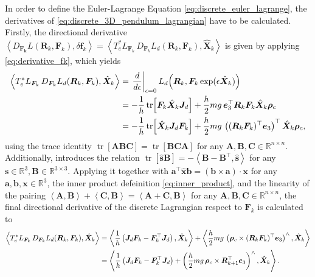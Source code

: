 In order to define the Euler-Lagrange Equation \eqref{eq:discrete_euler_lagrange}, the derivatives of \eqref{eq:discrete_3D_pendulum_lagrangian} have to be calculated. Firstly, the directional derivative $\left\langle D_{\bm{F_k}}L(\bm{R}_k, \bm{F}_k), \delta \bm{f}_k \right\rangle = \left\langle
T_e^*L_{\bm{F}_k}\,D_{\bm{F}_k}L_d(\bm{R}_k,\bm{F}_k),
\hat{\bm{X}}_k
\right\rangle$ is given by applying \eqref{eq:derivative_fk}, which yields
{\small
\begin{align}
\left\langle
T_e^*L_{\bm{F}_k}\,D_{\bm{F}_k}L_d(\bm{R}_k,\bm{F}_k),
\hat{\bm{X}}_k
\right\rangle
&=
\left.\frac{d}{d\epsilon}\right|_{\epsilon=0}
L_d\!\left(
\bm{R}_k,\bm{F}_k\exp(\epsilon\hat{\bm{X}}_k)
\right)
\notag\\
&=
-\frac{1}{h}\operatorname{tr}\!\left[
\bm{F}_k\hat{\bm{X}}_k \bm{J}_d
\right]
+\frac{h}{2}mg\,\bm{e}_3^{\top}\bm{R}_k\bm{F}_k
\hat{\bm{X}}_k\bm{\rho}_c
\notag\\
&=
-\frac{1}{h}\operatorname{tr}\!\left[
\hat{\bm{X}}_k\bm{J}_d\bm{F}_k
\right]
+\frac{h}{2}mg\,
\left((\bm{R}_k \bm{F}_k)^{\top}\bm{e}_3\right)^{\top}
\hat{\bm{X}}_k\bm{\rho}_c,
\notag
\end{align}}
using the trace identity $\operatorname{tr}[\bm{A B C}] = \operatorname{tr}[\bm{BCA}]$ for any $\bm{A}, \bm{B}, \bm{C} \in \mathbb{R}^{n \times n}$. Additionally, \cite{Lee2008} introduces the relation $\operatorname{tr}[\hat{\bm{s}}\bm{B}] = - \left\langle \bm{B}-\bm{B}^\top, \hat{\bm{s}} \right\rangle$ for any $\bm{s} \in \mathbb{R}^3,\bm{B} \in \mathbb{R}^{3 \times 3}$. Applying it together with $\bm{a}^\top \hat{\bm{x}}\bm{b} = (\bm{b} \times \bm{a}) \cdot \bm{x}$ for any $\bm{a}, \bm{b}, \bm{x} \in \mathbb{R}^3$, the inner product defeinition \eqref{eq:inner_product}, and the linearity of the pairing $\left\langle \bm{A}, \bm{B} \right\rangle + \left\langle \bm{C}, \bm{B} \right\rangle = \left\langle \bm{A}+\bm{C},\bm{B} \right\rangle$ for any $\bm{A}, \bm{B}, \bm{C} \in \mathbb{R}^{n \times n}$, the final directional derivative of the discrete Lagrangian respect to $\bm{F}_k$ is calculated to
{\small
\begin{align}
\left\langle
T_e^*L_{\bm{F}_k}\,D_{\bm{F}_k}L_d(\bm{R}_k,\bm{F}_k),
\hat{\bm{X}}_k
\right\rangle
&=
\left\langle
\frac{1}{h}
\left(\bm{J}_d\bm{F}_k-\bm{F}_k^{\top}\bm{J}_d\right),
\hat{\bm{X}}_k
\right\rangle
+\left\langle
\frac{h}{2}mg\,
\left(
\bm{\rho}_c\times (\bm{R}_k\bm{F}_k)^{\top}\bm{e}_3
\right)^\wedge,
\hat{\bm{X}}_k
\right\rangle
\notag\\
&=
\left\langle
\frac{1}{h}
\left(\bm{J}_d\bm{F}_k-\bm{F}_k^{\top}\bm{J}_d\right)
+
\left(
\frac{h}{2}mg\,
\bm{\rho}_c\times \bm{R}_{k+1}^{\top}\bm{e}_3
\right)^\wedge,
\hat{\bm{X}}_k
\right\rangle. \notag
\end{align}}
